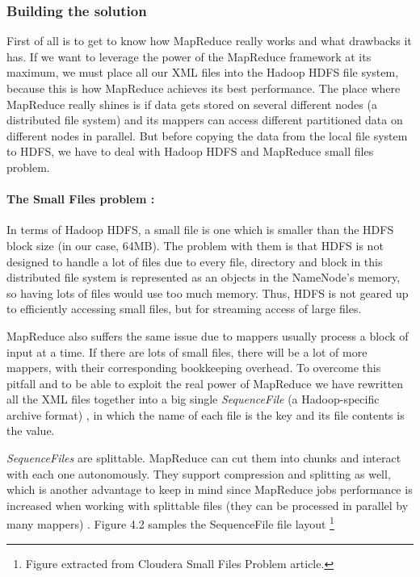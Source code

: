 \subsubsection{Building the solution}

First of all is to get to know how MapReduce really works and what drawbacks it has. If we want to leverage the power of the MapReduce framework at its maximum, we must place all our XML files into the Hadoop HDFS file system, because this is how MapReduce achieves its best performance. The place where MapReduce really shines is if data gets stored on several different nodes (a distributed file system) and its mappers can access different partitioned data on different nodes in parallel. But before copying the data from the local file system to HDFS, we have to deal with Hadoop HDFS and MapReduce small files problem.

\paragraph{The Small Files problem \cite{liu2009implementing}:} In terms of Hadoop HDFS, a small file is one which is smaller than the HDFS block size (in our case, 64MB). The problem with them is that HDFS is not designed to handle a lot of files due to every file, directory and block in this distributed file system is represented as an objects in the NameNode's memory, so having lots of files would use too much memory. Thus, HDFS is not geared up to efficiently accessing small files, but for streaming access of large files. 
\par
MapReduce also suffers the same issue due to mappers usually process a block of input at a time. If there are lots of small files, there will be a lot of more mappers, with their corresponding bookkeeping overhead. To overcome this pitfall and to be able to exploit the real power of MapReduce we have rewritten all the XML files together into a big single \textit{SequenceFile} (a Hadoop-specific archive format) \cite{ApacheHadoopSequenceFile}, in which the name of each file is the key and its file contents is the value. 
\par
\textit{SequenceFiles} are splittable. MapReduce can cut them into chunks and interact with each one autonomously. They support compression and splitting as well, which is another advantage to keep in mind since MapReduce jobs performance is increased when working with splittable files (they can be processed in parallel by many mappers)  \cite{SmallFiles}. Figure 4.2 samples the SequenceFile file layout \footnote{Figure extracted from Cloudera Small Files Problem article.}

